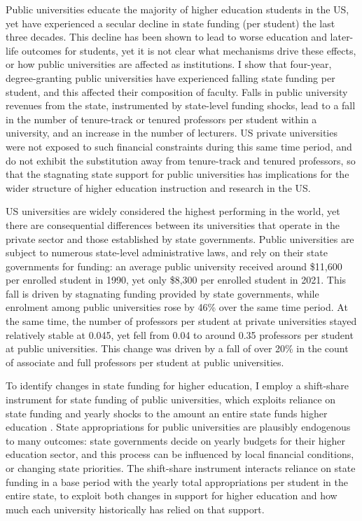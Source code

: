 \noindent
Public universities educate the majority of higher education students in the US, yet have experienced a secular decline in state funding (per student) the last three decades.
This decline has been shown to lead to worse education and later-life outcomes for students, yet it is not clear what mechanisms drive these effects, or how public universities are affected as institutions.
I show that four-year, degree-granting public universities have experienced falling state funding per student, and this affected their composition of faculty.
Falls in public university revenues from the state, instrumented by state-level funding shocks, lead to a fall in the number of tenure-track or tenured professors per student within a university, and an increase in the number of lecturers.
US private universities were not exposed to such financial constraints during this same time period, and do not exhibit the substitution away from tenure-track and tenured professors, so that the stagnating state support for public universities has implications for the wider structure of higher education instruction and research in the US.

US universities are widely considered the highest performing in the world, yet there are consequential differences between its universities that operate in the private sector and those established by state governments.
Public universities are subject to numerous state-level administrative laws, and rely on their state governments for funding: an average public university received around \$11,600 per enrolled student in 1990, yet only \$8,300 per enrolled student in 2021.
This fall is driven by stagnating funding provided by state governments, while enrolment among public universities rose by 46\% over the same time period.
At the same time, the number of professors per student at private universities stayed relatively stable at 0.045, yet fell from 0.04 to around 0.35 professors per student at public universities.
This change was driven by a fall of over 20\% in the count of associate and full professors per student at public universities.

To identify changes in state funding for higher education, I employ a shift-share instrument for state funding of public universities, which exploits reliance on state funding and yearly shocks to the amount an entire state funds higher education \citep{NBERw23736,NBERw27885}.
State appropriations for public universities are plausibly endogenous to many outcomes: state governments decide on yearly budgets for their higher education sector, and this process can be influenced by local financial conditions, or changing state priorities.
The shift-share instrument interacts reliance on state funding in a base period with the yearly total appropriations per student in the entire state, to exploit both changes in support for higher education and how much each university historically has relied on that support.

